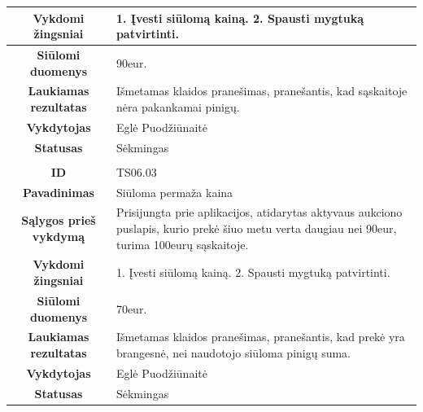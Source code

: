 \documentclass{VUMIFPSkursinis}
\begin{document}
	\begin{table}[H]
		\begin{tabular}{|p{6cm}|p{11cm}|}
			\hline
			\multicolumn{1}{|c|}{{\bfseries Vykdomi žingsniai}}&
			{1. Įvesti siūlomą kainą.
				2. Spausti mygtuką patvirtinti.}\\
			\hline
			\multicolumn{1}{|c|}{{\bfseries Siūlomi duomenys}}&
			{90eur.}\\
			\hline
			\multicolumn{1}{|c|}{{\bfseries Laukiamas rezultatas}}&
			{Išmetamas klaidos pranešimas, pranešantis, kad sąskaitoje nėra pakankamai pinigų.}\\
			\hline
			\multicolumn{1}{|c|}{{\bfseries Vykdytojas}}&
			{Eglė Puodžiūnaitė}\\
			\hline
			\multicolumn{1}{|c|}{{\bfseries Statusas}}&
			{Sėkmingas}\\
			\hline
			\rowcolor{lightgray}
			\multicolumn{2}{|c|}{}\\
			\hline
			\multicolumn{1}{|c|}{{\bfseries ID}}&
			{TS06.03}\\
			\hline
			\multicolumn{1}{|c|}{{\bfseries Pavadinimas}}&
			{Siūloma permaža kaina}\\
			\hline
			\multicolumn{1}{|c|}{{\bfseries Sąlygos prieš vykdymą}}&
			{Prisijungta prie aplikacijos, atidarytas aktyvaus aukciono puslapis, kurio prekė šiuo metu verta daugiau nei 90eur, turima 100eurų sąskaitoje.}\\
			\hline
			\multicolumn{1}{|c|}{{\bfseries Vykdomi žingsniai}}&
			{1. Įvesti siūlomą kainą.
				2. Spausti mygtuką patvirtinti.}\\
			\hline
			\multicolumn{1}{|c|}{{\bfseries Siūlomi duomenys}}&
			{70eur.}\\
			\hline
			\multicolumn{1}{|c|}{{\bfseries Laukiamas rezultatas}}&
			{Išmetamas klaidos pranešimas, pranešantis, kad prekė yra brangesnė, nei naudotojo siūloma pinigų suma.}\\
			\hline
			\multicolumn{1}{|c|}{{\bfseries Vykdytojas}}&
			{Eglė Puodžiūnaitė}\\
			\hline
			\multicolumn{1}{|c|}{{\bfseries Statusas}}&
			{Sėkmingas}\\
			\hline
		\end{tabular}
	\end{table}	
\end{document}
